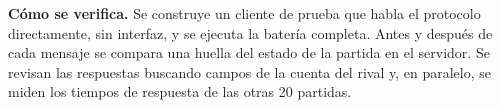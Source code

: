 \textbf{Cómo se verifica.} Se construye un cliente de prueba que habla el protocolo directamente, sin interfaz, y se ejecuta la batería completa. Antes y después de cada mensaje se compara una huella del estado de la partida en el servidor. Se revisan las respuestas buscando campos de la cuenta del rival y, en paralelo, se miden los tiempos de respuesta de las otras 20 partidas.
